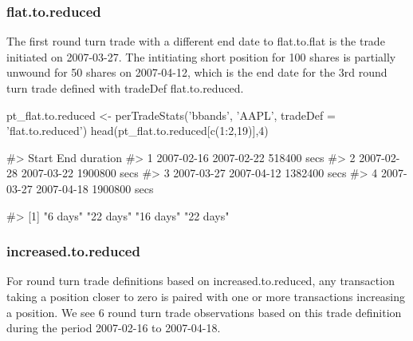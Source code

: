 \hypertarget{flat.to.reduced}{%
\subsubsection{flat.to.reduced}\label{flat.to.reduced}}

The first round turn trade with a different end date to flat.to.flat is
the trade initiated on 2007-03-27. The intitiating short position for
100 shares is partially unwound for 50 shares on 2007-04-12, which is
the end date for the 3rd round turn trade defined with tradeDef
flat.to.reduced.

\begin{Schunk}
\begin{Sinput}
pt_flat.to.reduced <- perTradeStats('bbands', 'AAPL', tradeDef = 'flat.to.reduced')
head(pt_flat.to.reduced[c(1:2,19)],4)
\end{Sinput}
\begin{Soutput}
#>        Start        End     duration
#> 1 2007-02-16 2007-02-22  518400 secs
#> 2 2007-02-28 2007-03-22 1900800 secs
#> 3 2007-03-27 2007-04-12 1382400 secs
#> 4 2007-03-27 2007-04-18 1900800 secs
\end{Soutput}
\begin{Soutput}
#> [1] "6 days"  "22 days" "16 days" "22 days"
\end{Soutput}
\end{Schunk}

\hypertarget{increased.to.reduced}{%
\subsubsection{increased.to.reduced}\label{increased.to.reduced}}

For round turn trade definitions based on increased.to.reduced, any
transaction taking a position closer to zero is paired with one or more
transactions increasing a position. We see 6 round turn trade
observations based on this trade definition during the period 2007-02-16
to 2007-04-18.


